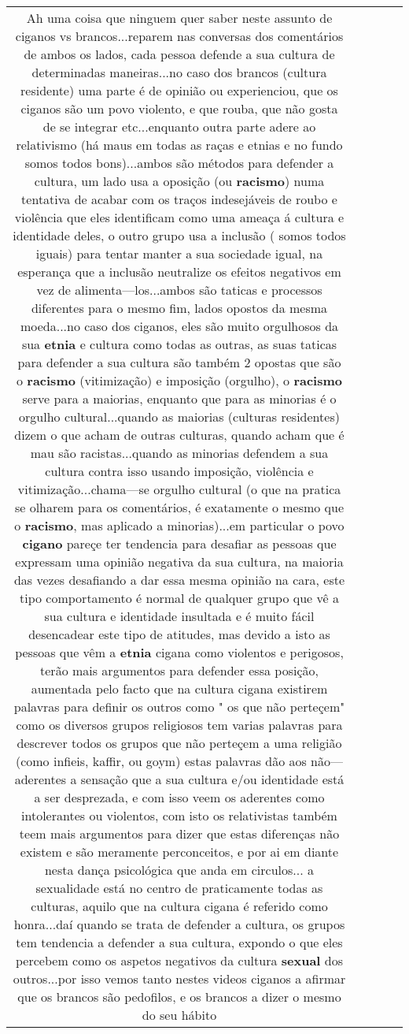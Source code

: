 \documentclass[11pt]{article}
\newlength\mylength
\begin{document}
\begin{center}
\begin{longtable}{|C{.65\mylength}|C{.30\mylength}|C{.12\mylength}|C{.12\mylength}|C{.12\mylength}|}
  \small Ah uma coisa que ninguem quer saber neste assunto de ciganos vs brancos...reparem nas conversas dos comentários de ambos os lados, cada pessoa defende a sua cultura de determinadas maneiras...no caso dos brancos (cultura residente) uma parte é de opinião ou experienciou, que os ciganos são um povo violento, e que rouba, que não gosta de se integrar etc...enquanto outra parte adere ao relativismo (há maus em todas as raças e etnias e no fundo somos todos bons)...ambos são métodos para defender a cultura, um lado usa a oposição (ou \textbf{racismo}) numa tentativa de acabar com os traços indesejáveis de roubo e violência que eles identificam como uma ameaça á cultura e identidade deles, o outro grupo usa a inclusão ( somos todos iguais) para tentar manter a sua sociedade igual, na esperança que a inclusão neutralize os efeitos negativos em vez de alimenta—los...ambos são taticas e processos diferentes para o mesmo fim, lados opostos da mesma moeda...no caso dos ciganos, eles são muito orgulhosos da sua \textbf{etnia} e cultura como todas as outras, as suas taticas para defender a sua cultura são também 2 opostas que são o \textbf{racismo} (vitimização) e imposição (orgulho), o \textbf{racismo} serve para a maiorias, enquanto que para as minorias é o orgulho cultural...quando as maiorias (culturas residentes) dizem o que acham de outras culturas, quando acham que é mau são racistas...quando as minorias defendem a sua cultura contra isso usando imposição, violência e vitimização...chama—se orgulho cultural (o que na pratica se olharem para os comentários, é exatamente o mesmo que o \textbf{racismo}, mas aplicado a minorias)...em particular o povo \textbf{cigano} pareçe ter tendencia para desafiar as pessoas que expressam uma opinião negativa da sua cultura, na maioria das vezes desafiando a dar essa mesma opinião na cara, este tipo comportamento é normal de qualquer grupo que vê a sua cultura e identidade insultada e é muito fácil desencadear este tipo de atitudes, mas devido a isto as pessoas que vêm a \textbf{etnia} cigana como violentos e perigosos, terão mais argumentos para defender essa posição, aumentada pelo facto que na cultura cigana existirem palavras para definir os outros como " os que não perteçem" como os diversos grupos religiosos tem varias palavras para descrever todos os grupos que não perteçem a uma religião (como infieis, kaffir, ou goym) estas palavras dão aos não—aderentes a sensação que a sua cultura e/ou identidade está a ser desprezada, e com isso veem os aderentes como intolerantes ou violentos, com isto os relativistas também teem mais argumentos para dizer que estas diferenças não existem e são meramente perconceitos, e por ai em diante nesta dança psicológica que anda em circulos... a sexualidade está no centro de praticamente todas as culturas, aquilo que na cultura cigana é referido como honra...daí quando se trata de defender a cultura, os grupos tem tendencia a defender a sua cultura, expondo o que eles percebem como os aspetos negativos da cultura \textbf{sexual} dos outros...por isso vemos tanto nestes videos ciganos a afirmar que os brancos são pedofilos, e os brancos a dizer o mesmo do seu hábito 
\end{longtable}
\end{center}
\end{document}
